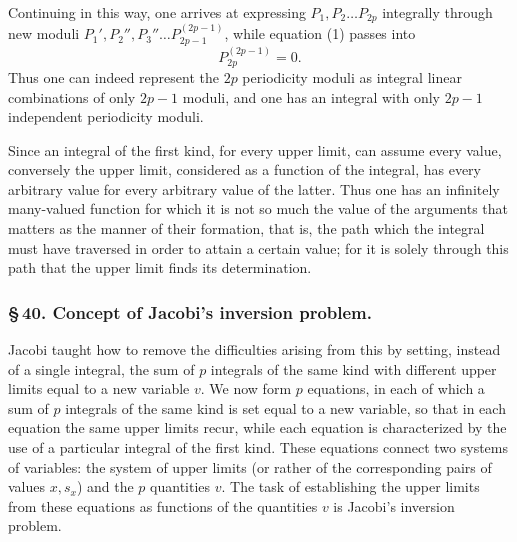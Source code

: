 \documentclass[10pt]{article}
\begin{document}
Continuing in this way, one arrives at expressing \(P_1,P_2\ldots P_{2p}\) integrally through new moduli \(P_1',P_2'',P_3''\ldots P_{2p-1}^{(2p-1)}\), while equation (1) passes into
\[
P_{2p}^{(2p-1)}=0.
\]
Thus one can indeed represent the \(2p\) periodicity moduli as integral linear combinations of only \(2p-1\) moduli, and one has an integral with only \(2p-1\) independent periodicity moduli.

Since an integral of the first kind, for every upper limit, can assume every value, conversely the upper limit, considered as a function of the integral, has every arbitrary value for every arbitrary value of the latter. Thus one has an infinitely many-valued function for which it is not so much the value of the arguments that matters as the manner of their formation, that is, the path which the integral must have traversed in order to attain a certain value; for it is solely through this path that the upper limit finds its determination.

\subsubsection*{\S\,40. Concept of Jacobi's inversion problem.}

Jacobi taught how to remove the difficulties arising from this by setting, instead of a single integral, the sum of \(p\) integrals of the same kind with different upper limits equal to a new variable \(v\). We now form \(p\) equations, in each of which a sum of \(p\) integrals of the same kind is set equal to a new variable, so that in each equation the same upper limits recur, while each equation is characterized by the use of a particular integral of the first kind. These equations connect two systems of variables: the system of upper limits (or rather of the corresponding pairs of values \(x,s_x\)) and the \(p\) quantities \(v\). The task of establishing the upper limits from these equations as functions of the quantities \(v\) is Jacobi's inversion problem.
\end{document}
